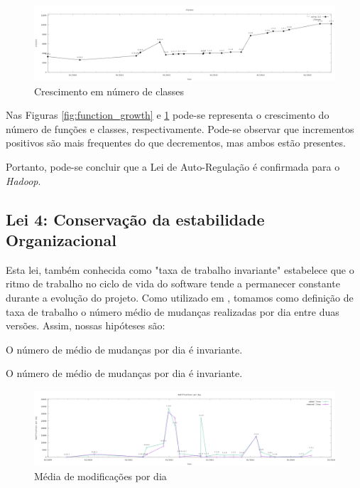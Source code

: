 \begin{figure}[h]
	\centering
	\includegraphics[width=1\linewidth]{figure/classes}
	\caption{Crescimento em número de classes}
	\label{fig:classes_growth}
\end{figure}

Nas Figuras \ref{fig:function_growth} e \ref{fig:classes_growth} pode-se representa o crescimento do número de funções e classes,  respectivamente. Pode-se observar que incrementos positivos são mais frequentes do que decrementos, mas ambos estão presentes.

Portanto, pode-se concluir que a Lei de Auto-Regulação é confirmada para o \textit{Hadoop}.


\subsection{Lei 4: Conservação da estabilidade Organizacional}
Esta lei, também conhecida como "taxa de trabalho invariante" estabelece que o ritmo de trabalho no ciclo de vida do software tende a permanecer constante durante a evolução do projeto. Como utilizado em \cite{neamtiu2013towards}, tomamos como definição de taxa de trabalho o número médio de mudanças realizadas por dia entre duas versões. Assim, nossas hipóteses são:
\begin{hypothesis}
	O número de médio de mudanças por dia é invariante.
\end{hypothesis}

\begin{hypothesis}
	O número de médio de mudanças por dia é invariante.
\end{hypothesis}
\begin{figure}
	\centering
	\includegraphics[width=1\linewidth]{figure/modifications_per_day}
	\caption{Média de modificações por dia}
	\label{fig:modificationsperday}
\end{figure}


